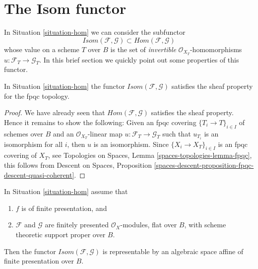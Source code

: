 \section{The Isom functor}
\label{section-isom}

\noindent
In Situation \ref{situation-hom} we can consider the subfunctor
$$
\mathit{Isom}(\mathcal{F}, \mathcal{G}) \subset
\mathit{Hom}(\mathcal{F}, \mathcal{G})
$$
whose value on a scheme $T$ over $B$ is the set of {\it invertible}
$\mathcal{O}_{X_T}$-homomorphisms $u : \mathcal{F}_T \to \mathcal{G}_T$.
In this brief section we quickly point out some properties of this
functor.

\begin{lemma}
\label{lemma-isom-sheaf}
In Situation \ref{situation-hom} the functor
$\mathit{Isom}(\mathcal{F}, \mathcal{G})$ 
satisfies the sheaf property for the fpqc topology.
\end{lemma}

\begin{proof}
We have already seen that $\mathit{Hom}(\mathcal{F}, \mathcal{G})$
satisfies the sheaf property. Hence it remains to show the following:
Given an fpqc covering $\{T_i \to T\}_{i \in I}$ of schemes over $B$
and an $\mathcal{O}_{X_T}$-linear map
$u : \mathcal{F}_T \to \mathcal{G}_T$ such that
$u_{T_i}$ is an isomorphism for all $i$, then $u$ is an isomorphism.
Since $\{X_i \to X_T\}_{i \in I}$ is an fpqc covering of $X_T$, see
Topologies on Spaces, Lemma \ref{spaces-topologies-lemma-fpqc},
this follows from
Descent on Spaces, Proposition
\ref{spaces-descent-proposition-fpqc-descent-quasi-coherent}.
\end{proof}

\begin{proposition}
\label{proposition-isom}
In Situation \ref{situation-hom} assume that
\begin{enumerate}
\item $f$ is of finite presentation, and
\item $\mathcal{F}$ and $\mathcal{G}$ are finitely presented
$\mathcal{O}_X$-modules, flat over $B$, with scheme theoretic
support proper over $B$.
\end{enumerate}
Then the functor $\mathit{Isom}(\mathcal{F}, \mathcal{G})$ is
representable by an algebraic space affine of finite presentation
over $B$.
\end{proposition}

